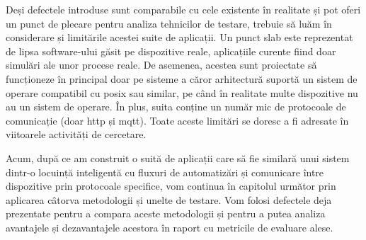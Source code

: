 Deși defectele introduse sunt comparabile cu cele existente în realitate și pot oferi un punct de plecare pentru analiza tehnicilor de testare, trebuie să luăm în considerare și limitările acestei suite de aplicații. Un punct slab este reprezentat de lipsa software-ului găsit pe dispozitive reale, aplicațiile curente fiind doar simulări ale unor procese reale. De asemenea, acestea sunt proiectate să funcționeze în principal doar pe sisteme a căror arhitectură suportă un sistem de operare compatibil cu \acrfull{posix} sau similar, pe când în realitate multe dispozitive nu au un sistem de operare. În plus, suita conține un număr mic de protocoale de comunicație (doar \acrshort{http} și \acrshort{mqtt}). Toate aceste limitări se doresc a fi adresate în viitoarele activități de cercetare.

Acum, după ce am construit o suită de aplicații care să fie similară unui sistem dintr-o locuință inteligentă cu fluxuri de automatizări și comunicare între dispozitive prin protocoale specifice, vom continua în capitolul următor prin aplicarea câtorva metodologii și unelte de testare. Vom folosi defectele deja prezentate pentru a compara aceste metodologii și pentru a putea analiza avantajele și dezavantajele acestora în raport cu metricile de evaluare alese.

